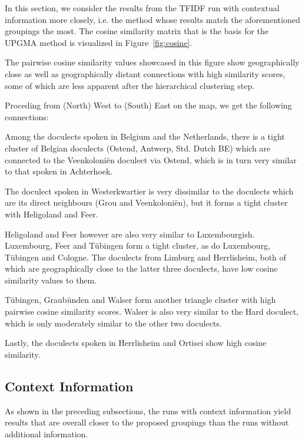\documentclass[a4paper]{article}
\begin{document}
In this section, we consider the results from
the TFIDF run with contextual information more closely,
i.e. the method whose results match the aforementioned
groupings the most.
The cosine similarity matrix that is the basis for the UPGMA method
is visualized in Figure~\ref{fig:cosine}.


The pairwise cosine similarity values showcased in this figure
show geographically close as well as geographically distant connections
with high similarity scores,
some of which are less apparent after the hierarchical clustering step.

Proceding from (North) West to (South) East on the map,
we get the following connections:

Among the doculects spoken in Belgium and the Netherlands,
there is a tight cluster of Belgian doculects (Ostend, Antwerp, Std. Dutch BE)
which are connected to the Veenkoloni\"{e}n doculect via Ostend,
which is in turn very similar to that spoken in Achterhoek.

The doculect spoken in Westerkwartier is very dissimilar to
the doculects which are its direct neighbours (Grou and Veenkoloni\"{e}n),
but it forms a tight cluster with Heligoland and Feer.

Heligoland and Feer however are also very similar to Luxembourgish.
Luxembourg, Feer and T\"{u}bingen form a tight cluster,
as do Luxembourg, T\"{u}bingen and Cologne.
The doculects from Limburg and Herrlisheim,
both of which are geographically close to the latter three doculects,
have low cosine similarity values to them.

T\"{u}bingen, Graub\"{u}nden and Walser form another
triangle cluster with high pairwise cosine similarity scores.
Walser is also very similar to the Hard doculect,
which is only moderately similar to the other two doculects.

Lastly, the doculects spoken in Herrlisheim and Ortisei
show high cosine similarity.

\subsection{Context Information}

As shown in the preceding subsections,
the runs with context information yield results
that are overall closer to the proposed groupings
than the runs without additional information.
\end{document}
